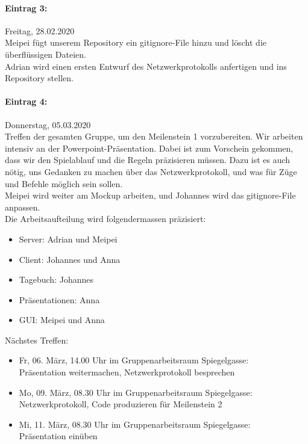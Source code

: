 \documentclass[12pt]{article}
\begin{document}
\paragraph{Eintrag 3:}
Freitag, 28.02.2020\\
Meipei f\"ugt unserem Repository ein gitignore-File hinzu und l\"oscht die \"uberfl\"ussigen Dateien.\\
Adrian wird einen ersten Entwurf des Netzwerkprotokolls anfertigen und ins Repository stellen.

\paragraph{Eintrag 4:}
Donnerstag, 05.03.2020\\
Treffen der gesamten Gruppe, um den Meilenstein 1 vorzubereiten. Wir arbeiten intensiv an der Powerpoint-Pr\"asentation. Dabei ist zum Vorschein gekommen, dass wir den Spielablauf und die Regeln pr\"azisieren m\"ussen. Dazu ist es auch n\"otig, uns Gedanken zu machen \"uber das Netzwerkprotokoll, und was f\"ur Z\"uge und Befehle m\"oglich sein sollen.\\
Meipei wird weiter am Mockup arbeiten, und Johannes wird das gitignore-File anpassen.\\
Die Arbeitsaufteilung wird folgendermassen pr\"azisiert:
\begin{itemize}
\item Server: Adrian und Meipei
\item Client: Johannes und Anna
\item Tagebuch: Johannes
\item Pr\"asentationen: Anna
\item GUI: Meipei und Anna\\
\end{itemize}

\noindent N\"achstes Treffen:
\begin{itemize}
\item Fr, 06. M\"arz, 14.00 Uhr im Gruppenarbeitsraum Spiegelgasse:\\
Pr\"asentation weitermachen, Netzwerkprotokoll besprechen
\item Mo, 09. M\"arz, 08.30 Uhr im Gruppenarbeitsraum Spiegelgasse:\\
Netzwerkprotokoll, Code produzieren f\"ur Meilenstein 2
\item Mi, 11. M\"arz, 08.30 Uhr im Gruppenarbeitsraum Spiegelgasse:\\
Pr\"asentation ein\"uben
\end{itemize}
\end{document}
